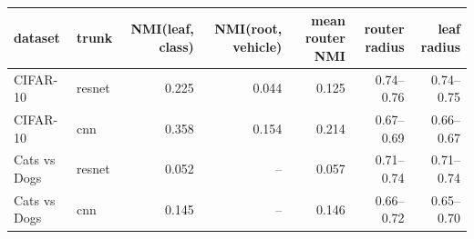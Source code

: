 \begin{tabular}{llrrrrr}
\toprule
dataset & trunk & NMI(leaf, class) & NMI(root, vehicle) & mean router NMI & router radius & leaf radius \\
\midrule
CIFAR-10 & resnet & 0.225 & 0.044 & 0.125 & 0.74--0.76 & 0.74--0.75 \\
CIFAR-10 & cnn & 0.358 & 0.154 & 0.214 & 0.67--0.69 & 0.66--0.67 \\
Cats vs Dogs & resnet & 0.052 & -- & 0.057 & 0.71--0.74 & 0.71--0.74 \\
Cats vs Dogs & cnn & 0.145 & -- & 0.146 & 0.66--0.72 & 0.65--0.70 \\
\bottomrule
\end{tabular}
